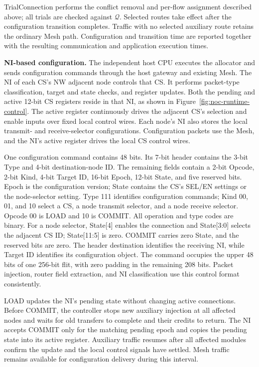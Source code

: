 \documentclass[conference,10pt]{IEEEtran}
\begin{document}
TrialConnection performs the conflict removal and per-flow assignment
described above; all trials are checked against $\mathcal Q$. Selected routes
take effect after the configuration transition completes.
Traffic with no selected auxiliary route retains the ordinary Mesh path.
Configuration and transition time are reported together with the resulting
communication and application execution times.

\noindent\textbf{NI-based configuration.}
The independent host CPU executes the allocator and sends configuration
commands through the host gateway and existing Mesh. The NI of each CS's NW
adjacent node controls that CS. It performs packet-type classification,
target and state checks, and register updates. Both the pending and active
12-bit CS registers reside in that NI, as shown in
Figure~\ref{fig:noc-runtime-control}. The active register continuously drives
the adjacent CS's selection and enable inputs over fixed local control wires.
Each node's NI also stores the local transmit- and receive-selector
configurations. Configuration packets use the Mesh, and the NI's active
register drives the local CS control wires.

One configuration command contains 48 bits. Its 7-bit header contains the
3-bit Type and 4-bit destination-node ID. The remaining fields contain a 2-bit
Opcode, 2-bit Kind, 4-bit Target ID, 16-bit Epoch, 12-bit State, and five reserved
bits. Epoch is the configuration version; State contains the CS's SEL/EN
settings or the node-selector setting. Type 111 identifies configuration commands; Kind 00, 01, and 10 select a
CS, a node transmit selector, and a node receive selector. Opcode 00 is LOAD
and 10 is COMMIT. All operation and type codes are binary. For a node selector,
State[4] enables the connection and State[3:0] selects the adjacent CS ID;
State[11:5] is zero. COMMIT carries zero State, and the reserved bits are zero.
The header destination identifies the receiving NI, while
Target ID identifies its configuration object. The command occupies the upper
48 bits of one 256-bit flit, with zero padding in the remaining 208 bits.
Packet injection, router field extraction, and NI classification use this
control format consistently.

LOAD updates the NI's pending state without changing active connections.
Before COMMIT, the controller stops new auxiliary injection at all affected
nodes and waits for old transfers to complete and their credits to return. The NI accepts COMMIT
only for the matching pending epoch and copies the pending state into its
active register. Auxiliary traffic resumes after all affected modules confirm
the update and the local control signals have settled. Mesh traffic remains
available for configuration delivery during this interval.
\end{document}
